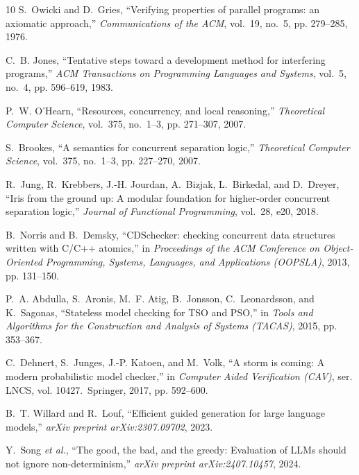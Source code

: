 \documentclass[journal,compsoc,10pt]{IEEEtran}
\theoremstyle{definition}
\theoremstyle{remark}
\begin{document}
\begin{thebibliography}{10}
S.~Owicki and D.~Gries, ``Verifying properties of parallel programs: an
  axiomatic approach,'' \emph{Communications of the ACM}, vol.~19, no.~5, pp.
  279--285, 1976.

C.~B. Jones, ``Tentative steps toward a development method for interfering
  programs,'' \emph{ACM Transactions on Programming Languages and Systems},
  vol.~5, no.~4, pp. 596--619, 1983.

P.~W. O'Hearn, ``Resources, concurrency, and local reasoning,''
  \emph{Theoretical Computer Science}, vol.~375, no.~1--3, pp. 271--307, 2007.

S.~Brookes, ``A semantics for concurrent separation logic,''
  \emph{Theoretical Computer Science}, vol.~375, no.~1--3, pp. 227--270, 2007.

R.~Jung, R.~Krebbers, J.-H. Jourdan, A.~Bizjak, L.~Birkedal, and D.~Dreyer,
  ``Iris from the ground up: A modular foundation for higher-order concurrent
  separation logic,'' \emph{Journal of Functional Programming}, vol.~28,
  e20, 2018.

B.~Norris and B.~Demsky, ``{CDSchecker}: checking concurrent data structures
  written with {C/C++} atomics,'' in \emph{Proceedings of the ACM Conference
  on Object-Oriented Programming, Systems, Languages, and Applications
  (OOPSLA)}, 2013, pp. 131--150.

P.~A. Abdulla, S.~Aronis, M.~F. Atig, B.~Jonsson, C.~Leonardsson, and
  K.~Sagonas, ``Stateless model checking for {TSO} and {PSO},'' in \emph{Tools
  and Algorithms for the Construction and Analysis of Systems (TACAS)}, 2015,
  pp. 353--367.

C.~Dehnert, S.~Junges, J.-P. Katoen, and M.~Volk, ``A storm is coming: A
  modern probabilistic model checker,'' in \emph{Computer Aided Verification
  (CAV)}, ser. LNCS, vol. 10427.\ Springer, 2017, pp. 592--600.

B.~T. Willard and R.~Louf, ``Efficient guided generation for large language
  models,'' \emph{arXiv preprint arXiv:2307.09702}, 2023.

Y.~Song \emph{et al.}, ``The good, the bad, and the greedy: Evaluation of
  {LLMs} should not ignore non-determinism,'' \emph{arXiv preprint
  arXiv:2407.10457}, 2024.


\end{thebibliography}
\end{document}
